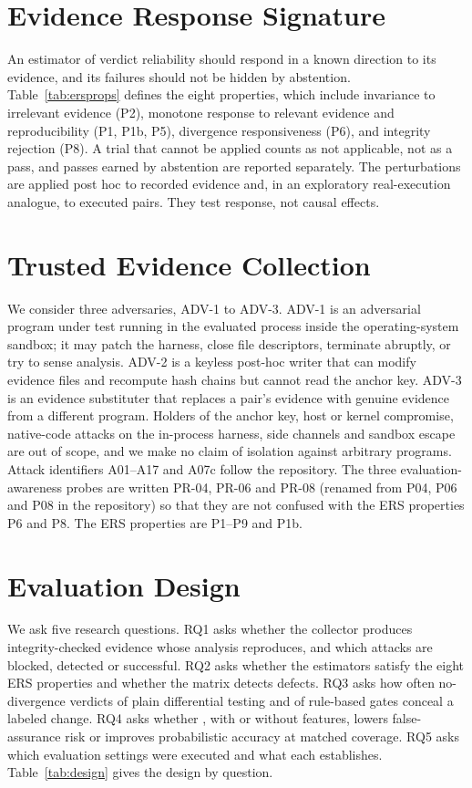 \documentclass{ieeeaccess}
\begin{document}
\section{Evidence Response Signature}\label{sec:ers}
An estimator of verdict reliability should respond in a known direction to its evidence, and its failures should not be hidden by abstention. Table~\ref{tab:ersprops} defines the eight properties, which include invariance to irrelevant evidence (P2), monotone response to relevant evidence and reproducibility (P1, P1b, P5), divergence responsiveness (P6), and integrity rejection (P8). A trial that cannot be applied counts as not applicable, not as a pass, and passes earned by abstention are reported separately. The perturbations are applied post hoc to recorded evidence and, in an exploratory real-execution analogue, to executed pairs. They test response, not causal effects.



\section{Trusted Evidence Collection}\label{sec:trust}
We consider three adversaries, ADV-1 to ADV-3. ADV-1 is an adversarial program under test running in the evaluated process inside the operating-system sandbox; it may patch the harness, close file descriptors, terminate abruptly, or try to sense analysis. ADV-2 is a keyless post-hoc writer that can modify evidence files and recompute hash chains but cannot read the anchor key. ADV-3 is an evidence substituter that replaces a pair's evidence with genuine evidence from a different program. Holders of the anchor key, host or kernel compromise, native-code attacks on the in-process harness, side channels and sandbox escape are out of scope, and we make no claim of isolation against arbitrary programs. Attack identifiers A01--A17 and A07c follow the repository. The three evaluation-awareness probes are written PR-04, PR-06 and PR-08 (renamed from P04, P06 and P08 in the repository) so that they are not confused with the ERS properties P6 and P8. The ERS properties are P1--P9 and P1b.

\section{Evaluation Design}\label{sec:design}
We ask five research questions. RQ1 asks whether the collector produces integrity-checked evidence whose analysis reproduces, and which attacks are blocked, detected or successful. RQ2 asks whether the estimators satisfy the eight ERS properties and whether the matrix detects defects. RQ3 asks how often no-divergence verdicts of plain differential testing and of rule-based gates conceal a labeled change. RQ4 asks whether \cec{}, with or without \ers{} features, lowers false-assurance risk or improves probabilistic accuracy at matched coverage. RQ5 asks which evaluation settings were executed and what each establishes. Table~\ref{tab:design} gives the design by question.
\end{document}
